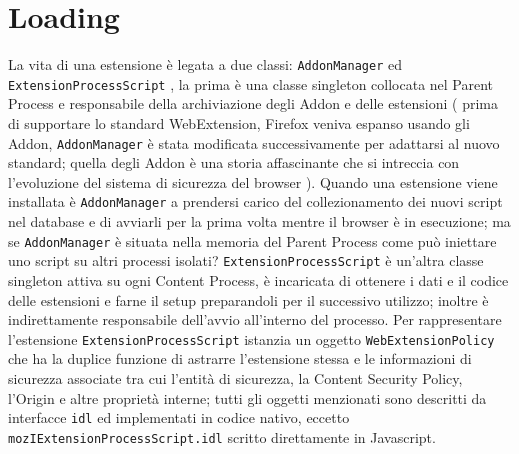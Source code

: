 \documentclass[]{sapthesis}
\newcommand{\code}[1]{\texttt{#1}}
\newcommand{\idl}{\code{idl} }
\newcommand{\AddonManager}{\code{AddonManager} }
\newcommand{\ExtensionProcessScript}{\code{ExtensionProcessScript} }
\newcommand{\WebExtensionPolicy}{\code{WebExtensionPolicy} }
\begin{document}
    \section{ Loading }
        La vita di una estensione è legata a due classi: \AddonManager ed \ExtensionProcessScript,
        la prima è una classe singleton collocata nel Parent Process e responsabile della archiviazione
        degli Addon e delle estensioni ( prima di supportare lo standard WebExtension, Firefox veniva espanso
        usando gli Addon, \AddonManager è stata modificata successivamente per adattarsi al nuovo standard; quella degli
        Addon è una storia affascinante che si intreccia con l'evoluzione del sistema di sicurezza del browser ).
        Quando una estensione viene installata è \AddonManager a prendersi carico del collezionamento dei nuovi
        script nel database e di avviarli per la prima volta mentre il browser è in esecuzione; ma se \AddonManager
        è situata nella memoria del Parent Process come può iniettare uno script su altri processi isolati?
        \ExtensionProcessScript è un'altra classe singleton attiva su ogni Content Process, è incaricata di
        ottenere i dati e il codice delle estensioni e farne il setup preparandoli per il successivo utilizzo;
        inoltre è indirettamente responsabile dell'avvio all'interno del processo. Per rappresentare l'estensione
        \ExtensionProcessScript istanzia un oggetto \WebExtensionPolicy che ha la duplice funzione di astrarre
        l'estensione stessa e le informazioni di sicurezza associate tra cui l'entità di sicurezza,
        la Content Security Policy, l'Origin e altre proprietà interne; tutti gli oggetti menzionati sono
        descritti da interfacce \idl ed implementati in codice nativo, eccetto \code{mozIExtensionProcessScript.idl}
        scritto direttamente in Javascript.
         

\newpage

\cite{security_principal}

\printbibliography
\end{document}
